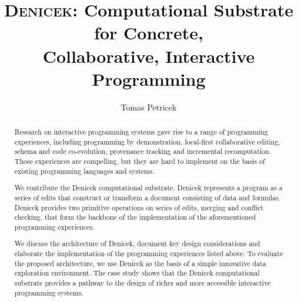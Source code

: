 \documentclass[sigconf]{acmart}
\begin{document}
\title[Denicek: Computational Substrate for Concrete, Collaborative, Interactive
  Programming]{{\scshape Denicek}: Computational Substrate for Concrete, \\Collaborative, Interactive Programming}

\author{Tomas Petricek}

\begin{abstract}
Research on interactive programming systems gave rise to a range of programming experiences,
including programming by demonstration, local-first collaborative editing, %
schema and code co-evo\-lution, provenance tracking and incremental recomputation. Those
experiences are compelling, but they are hard to implement on the basis of existing programming
languages and systems.

We contribute the Denicek computational substrate. Denicek represents a program as a series of edits
that construct or transform a document consisting of data and formulas. Denicek provides two
primitive operations on series of edits, merging and conflict checking, that form the backbone
of the implementation of the aforementioned programming experiences.

We discuss the architecture of Denicek, document key design considerations and elaborate
the implementation of the programming experiences listed above. To evaluate the proposed
architecture, we use Denicek as the basis of a simple innovative data exploration environment.
The case study shows that the Denicek computational substrate provides a pathway to the design
of richer and more accessible interactive programming systems.
\end{abstract}


\maketitle
\end{document}
